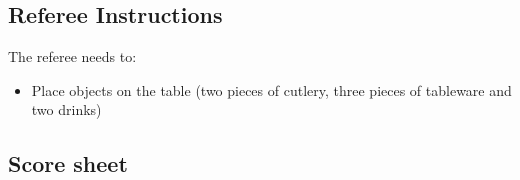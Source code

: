 \subsection*{Referee Instructions}

The referee needs to:
\begin{itemize}
	\item Place objects on the table (two pieces of cutlery, three pieces of tableware and two drinks)
\end{itemize}

\subsection*{Score sheet}


